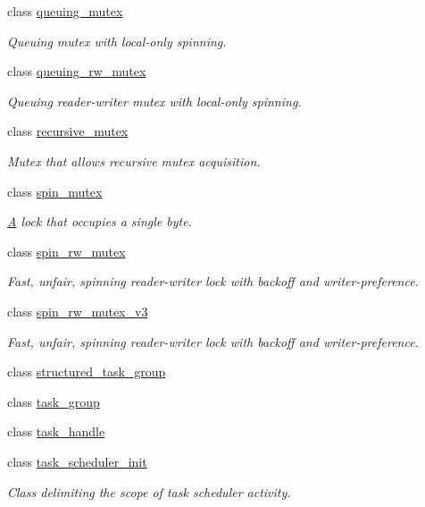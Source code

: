 \begin{DoxyCompactItemize}
class \hyperlink{classtbb_1_1queuing__mutex}{queuing\+\_\+mutex}
\begin{DoxyCompactList}\small\item\em Queuing mutex with local-\/only spinning. \end{DoxyCompactList}\item 
class \hyperlink{classtbb_1_1queuing__rw__mutex}{queuing\+\_\+rw\+\_\+mutex}
\begin{DoxyCompactList}\small\item\em Queuing reader-\/writer mutex with local-\/only spinning. \end{DoxyCompactList}\item 
class \hyperlink{classtbb_1_1recursive__mutex}{recursive\+\_\+mutex}
\begin{DoxyCompactList}\small\item\em Mutex that allows recursive mutex acquisition. \end{DoxyCompactList}\item 
class \hyperlink{classtbb_1_1spin__mutex}{spin\+\_\+mutex}
\begin{DoxyCompactList}\small\item\em \hyperlink{structA}{A} lock that occupies a single byte. \end{DoxyCompactList}\item 
class \hyperlink{classtbb_1_1spin__rw__mutex}{spin\+\_\+rw\+\_\+mutex}
\begin{DoxyCompactList}\small\item\em Fast, unfair, spinning reader-\/writer lock with backoff and writer-\/preference. \end{DoxyCompactList}\item 
class \hyperlink{classtbb_1_1spin__rw__mutex__v3}{spin\+\_\+rw\+\_\+mutex\+\_\+v3}
\begin{DoxyCompactList}\small\item\em Fast, unfair, spinning reader-\/writer lock with backoff and writer-\/preference. \end{DoxyCompactList}\item 
class \hyperlink{classtbb_1_1structured__task__group}{structured\+\_\+task\+\_\+group}
\item 
class \hyperlink{classtbb_1_1task__group}{task\+\_\+group}
\item 
class \hyperlink{classtbb_1_1task__handle}{task\+\_\+handle}
\item 
class \hyperlink{classtbb_1_1task__scheduler__init}{task\+\_\+scheduler\+\_\+init}
\begin{DoxyCompactList}\small\item\em Class delimiting the scope of task scheduler activity. \end{DoxyCompactList}\item 

\end{DoxyCompactItemize}

